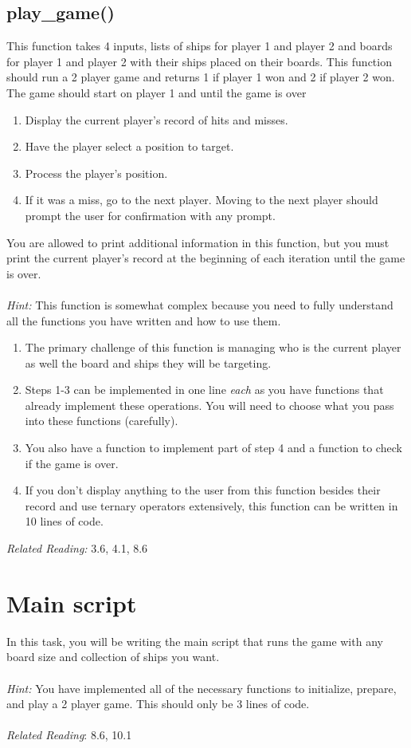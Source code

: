 \documentclass{article}
\begin{document}
\subsection{play\_game()}
This function takes 4 inputs, lists of ships for player 1 and player 2 and boards for player 1 and player 2 with their ships placed on their boards. This function should run a 2 player game and returns 1 if player 1 won and 2 if player 2 won. The game should start on player 1 and until the game is over
\begin{enumerate}
    \item Display the current player's record of hits and misses.
    \item Have the player select a position to target.
    \item Process the player's position.
    \item If it was a miss, go to the next player. Moving to the next player should prompt the user for confirmation with any prompt. 
\end{enumerate}
You are allowed to print additional information in this function, but you must print the current player's record at the beginning of each iteration until the game is over.\\\\
\textit{Hint:} This function is somewhat complex because you need to fully understand all the functions you have written and how to use them.
\begin{enumerate}
    \item The primary challenge of this function is managing who is the current player as well the board and ships they will be targeting.
    
    \item Steps 1-3 can be implemented in one line \textit{each} as you have functions that already implement these operations. You will need to choose what you pass into these functions (carefully).
    
    \item You also have a function to implement part of step 4 and a function to check if the game is over.
    
    \item If you don't display anything to the user from this function besides their record and use ternary operators extensively, this function can be written in 10 lines of code.
\end{enumerate}
\textit{Related Reading:} 3.6, 4.1, 8.6

\section{Main script}
In this task, you will be writing the main script that runs the game with any board size and collection of ships you want.\\\\
\textit{Hint:} You have implemented all of the necessary functions to initialize, prepare, and play a 2 player game. This should only be 3 lines of code.\\\\
\textit{Related Reading}: 8.6, 10.1
\end{document}
